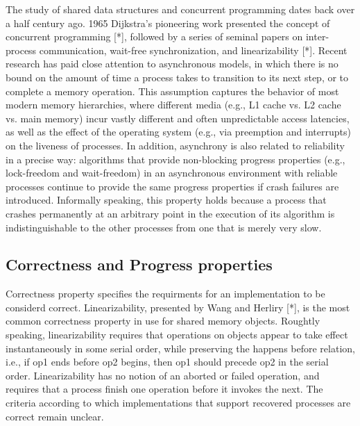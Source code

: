 \documentclass{article}
\begin{document}
The study of shared data structures and concurrent programming dates back over a half century ago. 1965 Dijkstra's pioneering work presented the concept of concurrent programming [*], followed by a series of seminal papers on inter-process communication, wait-free synchronization, and linearizability [*].
Recent research has paid close attention to asynchronous models, in which there is no bound on the amount of time a process takes to transition to its next step, or to complete a memory operation. This assumption captures the behavior of most modern memory hierarchies, where different media (e.g., L1 cache vs. L2 cache vs. main memory) incur vastly different and often unpredictable access latencies, as well as the effect of the operating system (e.g., via preemption and interrupts) on the liveness of processes. In addition, asynchrony is also related to reliability in a precise way: algorithms that provide non-blocking progress properties (e.g., lock-freedom and wait-freedom) in an asynchronous environment with reliable processes continue to provide the same progress properties if crash failures are introduced. Informally speaking, this property holds because a process that crashes permanently at an arbitrary point in the execution of its algorithm is indistinguishable to the other processes from one that is merely very slow.

\subsection{Correctness and Progress properties}
Correctness property specifies the requirments for an implementation to be considerd correct. Linearizability, presented by Wang and Herliry [*], is the most common correctness property in use for shared memory objects. Roughtly speaking, linearizability requires that operations on objects appear to take effect instantaneously in some serial order, while preserving the happens before relation, i.e., if op1 ends before op2 begins, then op1 should precede op2 in the serial order. Linearizability has no notion of an aborted or failed operation, and requires that a process finish one operation before it invokes the next. The criteria according to which implementations that support recovered processes are correct remain unclear.






\end{document}

